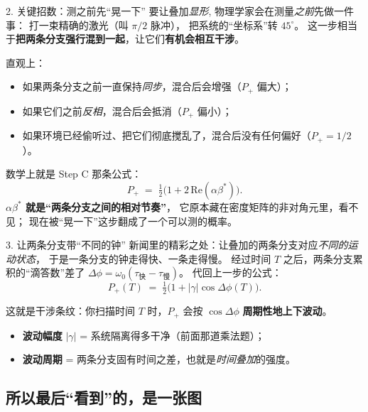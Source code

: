 \documentclass[11pt,a4paper]{ctexart}
\begin{document}
\begin{stepblock}{2. 关键招数：测之前先``晃一下''}
要让叠加\emph{显形}, 物理学家会在测量\emph{之前}先做一件事：
打一束精确的激光（叫 $\pi/2$ 脉冲），
把系统的``坐标系''转 $45^{\circ}$。
这一步相当于\textbf{把两条分支强行混到一起}，让它们\textbf{有机会相互干涉}。
\smallskip

直观上：
\begin{itemize}
  \item 如果两条分支之前一直保持\emph{同步}，混合后会增强（$P_{+}$ 偏大）；
  \item 如果它们之前\emph{反相}，混合后会抵消（$P_{+}$ 偏小）；
  \item 如果环境已经偷听过、把它们彻底搅乱了，混合后没有任何偏好（$P_{+}=1/2$）。
\end{itemize}

数学上就是 Step C 那条公式：
\[
  P_{+} \;=\; \tfrac{1}{2}\bigl(1 + 2\,\mathrm{Re}(\alpha\beta^{*})\bigr).
\]
\textbf{$\alpha\beta^{*}$ 就是``两条分支之间的相对节奏''}，
它原本藏在密度矩阵的非对角元里，看不见；
现在被``晃一下''这步翻成了一个可以测的概率。
\end{stepblock}

\begin{stepblock}{3. 让两条分支带``不同的钟''}
新闻里的精彩之处：让叠加的两条分支对应\emph{不同的运动状态}，
于是一条分支的钟走得快、一条走得慢。
经过时间 $T$ 之后，两条分支累积的``滴答数''差了
$\Delta\phi = \omega_0(\tau_{\text{快}} - \tau_{\text{慢}})$。
代回上一步的公式：
\[
  P_{+}(T) \;=\; \tfrac{1}{2}\bigl(1 + |\gamma|\cos\Delta\phi(T)\bigr).
\]
\smallskip

这就是干涉条纹：你扫描时间 $T$ 时，$P_{+}$ 会按 $\cos\Delta\phi$
\textbf{周期性地上下波动}。
\begin{itemize}
  \item \textbf{波动幅度} $|\gamma|$ = 系统隔离得多干净（前面那道乘法题）；
  \item \textbf{波动周期} = 两条分支固有时间之差，也就是\emph{时间叠加}的强度。
\end{itemize}
\end{stepblock}

\subsection{所以最后``看到''的，是一张图}
\end{document}
